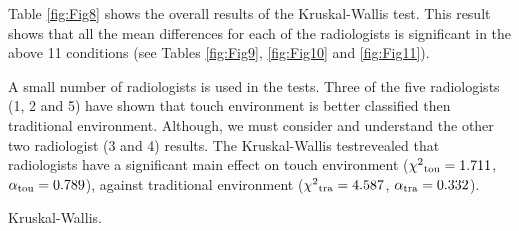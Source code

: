 \documentclass{chi-ext}
\begin{document}
Table \ref{fig:Fig8}  shows the overall results of the Kruskal-Wallis test. This result shows that all the mean differences for each of the radiologists is significant in the above 11 conditions (see Tables \ref{fig:Fig9}, \ref{fig:Fig10} and \ref{fig:Fig11}).

A small number of radiologists is used in the tests. Three of the five radiologists (1, 2 and 5) have shown that touch environment is better classified then traditional environment. Although, we must consider and understand the other two radiologist (3 and 4) results. The Kruskal-Wallis test\footnotemark revealed that radiologists have a significant main effect on touch environment ($\chi^2\textsubscript{tou} = 1.711$, $\alpha\textsubscript{tou} = 0.789$), against traditional environment ($\chi^2\textsubscript{tra} = 4.587$, $\alpha\textsubscript{tra} = 0.332$).

\begin{table}
\caption{Kruskal-Wallis.}
\label{fig:Fig8}
\end{table}
\end{document}
